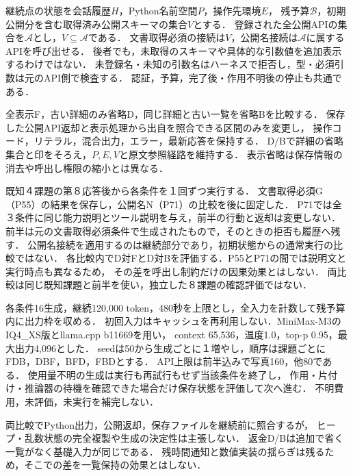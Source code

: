 継続点の状態を会話履歴$H$，Python名前空間$P$，操作先環境$E$，
残予算$\mathcal B$，初期公開分を含む取得済み公開スキーマの集合$V$とする．
登録された全公開APIの集合を$\mathcal A$とし，$V\subseteq\mathcal A$である．
文書取得必須の接続は$V$，公開名接続は$\mathcal A$に属するAPIを呼び出せる．
後者でも，未取得のスキーマや具体的な引数値を追加表示するわけではない．
未登録名・未知の引数名はハーネスで拒否し，型・必須引数は元のAPI側で検査する．
認証，予算，完了後・作用不明後の停止も共通である．

全表示F，古い詳細のみ省略D，同じ詳細と古い一覧を省略Bを比較する．
保存した公開API返却と表示処理から出自を照合できる区間のみを変更し，
操作コード，リテラル，混合出力，エラー，最新応答を保持する．
D/Bで詳細の省略集合と印をそろえ，$P,E,V$と原文参照経路を維持する．
表示省略は保存情報の消去や呼出し権限の縮小とは異なる．

既知４課題の第８応答後から各条件を１回ずつ実行する．
文書取得必須G（P55）の結果を保存し，公開名N（P71）の比較を後に固定した．
P71では全３条件に同じ能力説明とツール説明を与え，前半の行動と返却は変更しない．
前半は元の文書取得必須条件で生成されたもので，そのときの拒否も履歴へ残す．
公開名接続を適用するのは継続部分であり，初期状態からの通常実行の比較ではない．
各比較内でD対FとD対Bを評価する．P55とP71の間では説明文と実行時点も異なるため，
その差を呼出し制約だけの因果効果とはしない．
両比較は同じ既知課題と前半を使い，独立した８課題の確認評価ではない．

各条件16生成，継続120,000 token，480秒を上限とし，全入力を計数して残予算内に出力枠を収める．
初回入力はキャッシュを再利用しない．MiniMax-M3のIQ4\_XS版とllama.cpp b11669を用い，
context 65,536，温度1.0，top-p 0.95，最大出力4,096とした．
seedは50から生成ごとに１増やし，順序は課題ごとにFDB，DBF，BFD，FBDとする．
API上限は前半込みで写真160，他80である．
使用量不明の生成は実行も再試行もせず当該条件を終了し，
作用・片付け・推論器の待機を確認できた場合だけ保存状態を評価して次へ進む．
不明費用，未評価，未実行を補完しない．

両比較でPython出力，公開返却，保存ファイルを継続前に照合するが，
ヒープ・乱数状態の完全複製や生成の決定性は主張しない．
返金D/Bは追加で省く一覧がなく基礎入力が同じである．
残時間通知と数値実装の揺らぎは残るため，そこでの差を一覧保持の効果とはしない．
